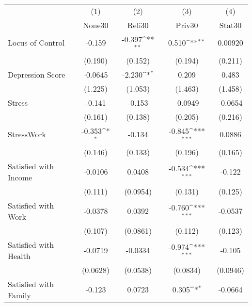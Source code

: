 {
\def\sym#1{\ifmmode^{#1}\else\(^{#1}\)\fi}
\begin{tabular}{l*{4}{c}}
\hline\hline
            &\multicolumn{1}{c}{(1)}&\multicolumn{1}{c}{(2)}&\multicolumn{1}{c}{(3)}&\multicolumn{1}{c}{(4)}\\
            &\multicolumn{1}{c}{None30}&\multicolumn{1}{c}{Reli30}&\multicolumn{1}{c}{Priv30}&\multicolumn{1}{c}{Stat30}\\
\hline
Locus of Control&      -0.159         &      -0.397\sym{**} &       0.510\sym{**} &     0.00920         \\
            &     (0.190)         &     (0.152)         &     (0.194)         &     (0.211)         \\
[1em]
Depression Score&     -0.0645         &      -2.230\sym{*}  &       0.209         &       0.483         \\
            &     (1.225)         &     (1.053)         &     (1.463)         &     (1.458)         \\
[1em]
Stress      &      -0.141         &      -0.153         &     -0.0949         &     -0.0654         \\
            &     (0.161)         &     (0.138)         &     (0.205)         &     (0.216)         \\
[1em]
StressWork  &      -0.353\sym{*}  &      -0.134         &      -0.845\sym{***}&      0.0886         \\
            &     (0.146)         &     (0.133)         &     (0.196)         &     (0.165)         \\
[1em]
Satisfied with Income&     -0.0106         &      0.0408         &      -0.534\sym{***}&      -0.122         \\
            &     (0.111)         &    (0.0954)         &     (0.131)         &     (0.125)         \\
[1em]
Satisfied with Work&     -0.0378         &      0.0392         &      -0.760\sym{***}&     -0.0537         \\
            &     (0.107)         &    (0.0861)         &     (0.112)         &     (0.123)         \\
[1em]
Satisfied with Health&     -0.0719         &     -0.0334         &      -0.974\sym{***}&      -0.105         \\
            &    (0.0628)         &    (0.0538)         &    (0.0834)         &    (0.0946)         \\
[1em]
Satisfied with Family&      -0.123         &      0.0723         &       0.305\sym{*}  &     -0.0664         \\

\end{tabular}}
